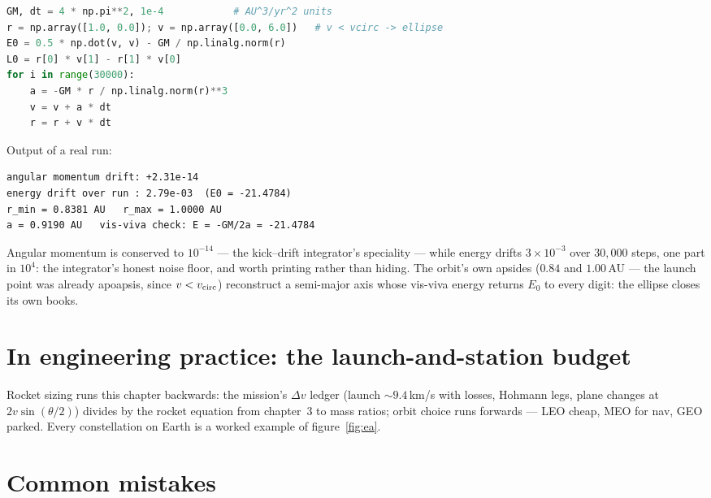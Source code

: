 \begin{lstlisting}[language=Python,caption={\texttt{code/ch08\_orbit\_audit.py} --- eccentric orbit: conservation drift, apsides, and the vis-viva check.},label={lst:orbitaudit}]
GM, dt = 4 * np.pi**2, 1e-4            # AU^3/yr^2 units
r = np.array([1.0, 0.0]); v = np.array([0.0, 6.0])   # v < vcirc -> ellipse
E0 = 0.5 * np.dot(v, v) - GM / np.linalg.norm(r)
L0 = r[0] * v[1] - r[1] * v[0]
for i in range(30000):
    a = -GM * r / np.linalg.norm(r)**3
    v = v + a * dt
    r = r + v * dt
\end{lstlisting}

Output of a real run:
\begin{lstlisting}[numbers=none]
angular momentum drift: +2.31e-14
energy drift over run : 2.79e-03  (E0 = -21.4784)
r_min = 0.8381 AU   r_max = 1.0000 AU
a = 0.9190 AU   vis-viva check: E = -GM/2a = -21.4784
\end{lstlisting}

Angular momentum is conserved to $10^{-14}$ --- the kick--drift
integrator's speciality --- while energy drifts $3\times10^{-3}$
over $30{,}000$ steps, one part in $10^{4}$: the integrator's honest
noise floor, and worth printing rather than hiding. The orbit's own
apsides ($0.84$ and $1.00$\,AU --- the launch point was already
apoapsis, since $v<v_{\rm circ}$) reconstruct a semi-major axis
whose vis-viva energy returns $E_0$ to every digit: the ellipse
closes its own books.

\section{In engineering practice: the launch-and-station budget}\label{sec:grav-eng}

Rocket sizing runs this chapter backwards: the mission's $\Delta v$
ledger (launch $\sim9.4$\,km/s with losses, Hohmann legs, plane changes
at $2v\sin(\theta/2)$) divides by the rocket equation from chapter~3 to
mass ratios; orbit choice runs forwards --- LEO cheap, MEO for nav,
GEO parked. Every constellation on Earth is a worked example of
figure~\ref{fig:ea}.

\section{Common mistakes}\label{sec:grav-mistakes}

